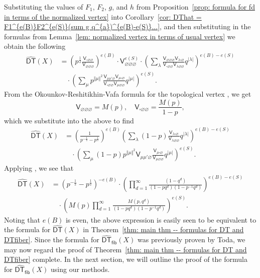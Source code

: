 \documentclass[12pt]{amsart}
\theoremstyle{definition}
\newcommand{\sfV}{\mathsf{V}}
\newcommand{\DT}{\mathsf{DT}}
\renewcommand{\emptyset}{\varnothing}
\newcommand{\DThat}{\widehat{\DT}}
\newcommand{\fiber}{\mathsf{fib}}
\newcommand{\half}{\frac{1}{2}}
\newcommand{\bx}{\square}
\begin{document}
Substituting the values of $F_{1}$, $F_{2}$, $g$, and $h$ from
Proposition~\ref{prop: formula for fd in terms of the normalized
vertex} into Corollary~\ref{cor: DThat = F1^{e(B)}F2^{e(S)}(sum g
q^{a})^{e(B)-e(S)}...}, and then substituting in the formulas from
Lemma~\ref{lem: normalized vertex in terms of usual vertex} we obtain
the following
\begin{align*}
\DThat (X) & = \left(p^{\half}\frac{\sfV_{\bx \emptyset
\emptyset}}{\sfV_{\emptyset \emptyset \emptyset}} \right)^{e(B)}\cdot
\sfV_{\emptyset \emptyset \emptyset }^{e(S)} \cdot
\left(\sum_{\lambda} \frac{\sfV_{\emptyset \emptyset \emptyset }
\sfV_{\lambda \bx \emptyset}}{\sfV_{\bx \emptyset
\emptyset}\sfV_{\lambda \emptyset \emptyset}}q^{|\lambda |}
\right)^{e(B)-e(S)}\\
&\quad \cdot \left(\sum_{\mu} p^{\Vert \mu \Vert^{2}} \frac{\sfV_{\mu \mu'
\emptyset} \sfV_{\mu \bx \emptyset}}{\sfV_{\bx \emptyset
\emptyset}\sfV_{\mu \emptyset \emptyset}}q^{|\mu |} \right)^{e(S)}.
\end{align*}
From the Okounkov-Reshitikhin-Vafa formula for the topological vertex
\cite{Ok-Re-Va}, \cite[eqn~5]{Bryan-Kool-Young} we get
\[
\sfV_{\emptyset \emptyset \emptyset} =M(p),\quad \sfV_{\bx \emptyset
\emptyset} = \frac{M(p)}{1-p},
\]
which we substitute into the above to find
\begin{align*}
\DThat (X) &= \left(\frac{1}{p^{-\half}-p^{\half}} \right)^{e(B)}
\left(\sum_{\lambda} (1-p)\frac{\sfV_{\lambda \bx
\emptyset}}{\sfV_{\lambda \emptyset \emptyset}} q^{|\lambda
|}\right)^{e(B)-e(S)} \\
&\quad \cdot \left(\sum_{\mu} (1-p)p^{\Vert \mu \Vert^{2}} \sfV_{\mu \mu'
\emptyset}\frac{\sfV_{\mu \bx \emptyset}}{\sfV_{\mu \emptyset
\emptyset}}q^{|\mu |} \right)^{e(S)}.
\end{align*}
Applying \cite[eqns~(2)\&(4)]{Bryan-Kool-Young}, we see that 
\begin{align*}
\DThat (X) &=\left(p^{-\half}-p^{\half} \right)^{-e(B)} \cdot
\left(\prod_{d=1}^{\infty} \frac{(1-q^{d})}{(1-pq^{d})(1-p^{-1}q^{d})} \right)^{e(B)-e(S)}\\
&\quad \cdot \left(M(p) \prod_{d=1}^{\infty}
\frac{M(p,q^{d})}{(1-pq^{d})(1-p^{-1}q^{d})} \right)^{e(S)} .
\end{align*}
Noting that $e(B)$ is even, the above expression is easily seen to be
equivalent to the formula for $\DThat (X)$ in Theorem~\ref{thm: main
thm -- formulas for DT and DTfiber}. Since the formula for
$\DThat_{\fiber}(X)$ was previously proven by Toda, we may now regard
the proof of Theorem~\ref{thm: main thm -- formulas for DT and
DTfiber} complete. In the next section, we will outline the proof of
the formula for $\DThat_{\fiber}(X)$ using our methods.
\end{document}
